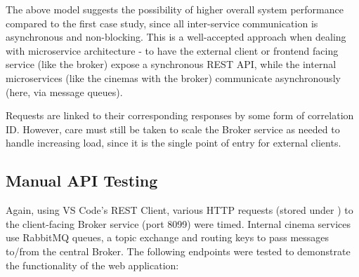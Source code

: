The above model suggests the possibility of higher overall system performance compared to the first case study, since all inter-service communication is asynchronous and non-blocking. This is a well-accepted approach when dealing with microservice architecture - to have the external client or frontend facing service (like the broker) expose a synchronous REST API, while the internal microservices (like the cinemas with the broker) communicate asynchronously (here, via message queues).

Requests are linked to their corresponding responses by some form of correlation ID. However, care must still be taken to scale the Broker service as needed to handle increasing load, since it is the single point of entry for external clients.

\subsection{Manual API Testing}

Again, using VS Code's REST Client, various HTTP requests (stored under ) to the client-facing Broker service (port 8099) were timed. Internal cinema services use RabbitMQ queues, a topic exchange and routing keys to pass messages to/from the central Broker. The following endpoints were tested to demonstrate the functionality of the web application:

